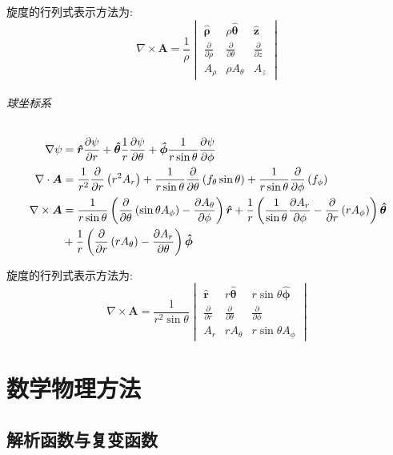 \documentclass[UTF8]{ctexbook}
\newcommand{\bv}[1]{\boldsymbol{\hat{#1}}}
\newcommand{\pd}[2]{\frac{\partial #1}{\partial #2}}
\newcommand{\downpd}[2]{\frac{\partial}{\partial #2}\left(#1\right)}
\begin{document}
旋度的行列式表示方法为:
\begin{equation}
    \nabla \times \boldsymbol{A} = \frac{1}{\rho}
    \begin{vmatrix}
        \bv{\rho} & \rho\bv{\theta} & \bv{z} \\
        \pd{}{\rho} & \pd{}{\theta} & \pd{}{z} \\
        A_\rho & \rho A_\theta & A_z
    \end{vmatrix}
\end{equation}

\paragraph{球坐标系}
\begin{align}
    \nabla \psi &= \bv{r} \pd{\psi}{r} + \bv{\theta} \frac{1}{r} \pd{\psi}{\theta} + \bv{\phi} \frac{1}{r\sin \theta} \pd{\psi}{\phi}\\
    \nabla \cdot \boldsymbol{A} &= \frac{1}{r^2}\downpd{r^2A_r}{r} + \frac{1}{r\sin \theta}\downpd{f_\theta \sin \theta}{\theta} + \frac{1}{r\sin \theta}\downpd{f_\phi}{\phi} \\
    \nabla \times \boldsymbol{A} &= \frac{1}{r\sin \theta}\left( \downpd{\sin \theta A_\phi}{\theta} - \pd{A_\theta}{\phi} \right) \bv{r} + \frac{1}{r} \left( \frac{1}{\sin \theta} \pd{A_r}{\phi} - \downpd{rA_\phi}{r}\right) \bv{\theta} \notag \\
    &+ \frac{1}{r}\left( \downpd{rA_\theta}{r} - \pd{A_r}{\theta} \right) \bv{\phi}
\end{align}

旋度的行列式表示方法为:
\begin{equation}
    \nabla \times \boldsymbol{A} = \frac{1}{r^2 \sin \theta}
    \begin{vmatrix}
        \bv{r} & r\bv{\theta} & r\sin \theta \bv{\phi} \\
        \pd{}{r} & \pd{}{\theta} & \pd{}{\phi} \\
        A_r &  rA_\theta & r\sin \theta A_\phi
    \end{vmatrix}
\end{equation}

\part{数学物理方法}

\chapter{解析函数与复变函数}
\end{document}
